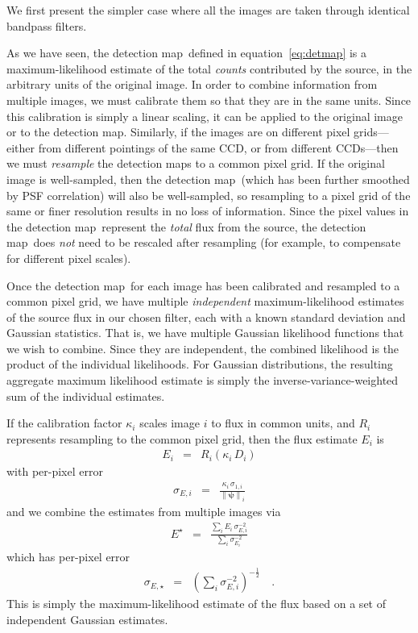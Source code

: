 \documentclass[letterpaper,preprint]{aastex}
\newcommand{\equationname}{equation}
\newcommand{\eqnref}[1]{\mbox{\equationname~\ref{#1}}}
\newcommand{\detmap}{detection map}
\newcommand{\psf}{\psi}
\newcommand{\psfnorm}{\norm{\bm{\psf}}}
\newcommand{\norm}[1]{\left\lVert #1 \right\rVert}
\begin{document}
We first present the simpler case where all the images are taken
through identical bandpass filters.

As we have seen, the \detmap\ defined in \eqnref{eq:detmap} is a
maximum-likelihood estimate of the total \emph{counts} contributed by
the source, in the arbitrary units of the original image.  In order to
combine information from multiple images, we must calibrate them so
that they are in the same units.  Since this calibration is simply a
linear scaling, it can be applied to the original image or to the
\detmap.  Similarly, if the images are on different pixel
grids---either from different pointings of the same CCD, or from
different CCDs---then we must \emph{resample} the \detmap s to a
common pixel grid.
%
If the original image is well-sampled, then the \detmap\ (which has
been further smoothed by PSF correlation) will also be well-sampled,
so resampling to a pixel grid of the same or finer resolution results
in no loss of information.
%
Since the pixel values in the \detmap\ represent the \emph{total} flux
from the source, the \detmap\ does \emph{not} need to be rescaled after
resampling (for example, to compensate for different pixel scales).


Once the \detmap\ for each image has been calibrated and resampled to
a common pixel grid, we have multiple \emph{independent}
maximum-likelihood estimates of the source flux in our chosen filter,
each with a known standard deviation and Gaussian statistics.  That
is, we have multiple Gaussian likelihood functions that we wish to
combine.  Since they are independent, the combined likelihood is the
product of the individual likelihoods.  For Gaussian distributions,
the resulting aggregate maximum likelihood estimate is simply the
inverse-variance-weighted sum of the individual estimates.




If the calibration factor $\kappa_i$ scales image $i$ to flux in
common units, and $R_i$ represents resampling to the common pixel grid,
then the flux estimate $E_i$ is
\begin{eqnarray}
E_i &=& R_i(\kappa_i \, D_i)
\end{eqnarray}
with per-pixel error
\begin{eqnarray}
\sigma_{E, i} &=& \frac{\kappa_i \, \sigma_{1,i}}{\psfnorm_i}
\end{eqnarray}
and we combine the estimates from multiple images via
\begin{eqnarray}
E^{\star} &=& \frac{\displaystyle\sum_i E_i \, \sigma^{-2}_{E,i}}{\displaystyle\sum_i \sigma^{-2}_{E_i}}
\label{eq:onebandmap}
\end{eqnarray}
which has per-pixel error
\begin{eqnarray}
\sigma_{E, \star} &=& \left( \sum_i \sigma^{-2}_{E,i} \right)^{-\frac{1}{2}}    \quad .
\end{eqnarray}
This is simply the maximum-likelihood estimate of the flux based on a
set of independent Gaussian estimates.
\end{document}
